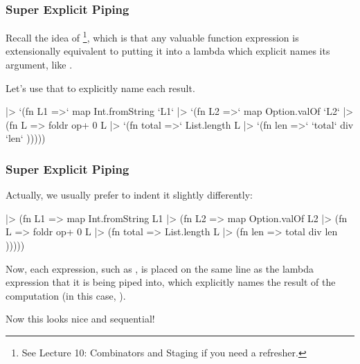 \documentclass[aspectratio=169, handout]{beamer}
\begin{document}
\begin{frame}[fragile]
  \frametitle{Super Explicit Piping}

  Recall the idea of \footnote{
    See Lecture 10: Combinators and Staging if you need a refresher.
  }, which is that any valuable
  function expression  is extensionally equivalent to putting it
  into a lambda which explicit names its argument, like .

  \pause
  \vspace{\fill}

  Let's use that to explicitly name each result.

  \pause
  \vspace{\fill}

  \begin{codeblock}
    ["1", "2", "3"]
    |> `(fn L1 =>`    map Int.fromString `L1`
    |> `(fn L2 =>`    map Option.valOf `L2`
    |> (fn L =>     foldr op+ 0 L
    |> `(fn total =>` List.length L
    |> `(fn len =>`   `total` div `len` )))))
  \end{codeblock}
\end{frame}


\begin{frame}[fragile]
  \frametitle{Super Explicit Piping}

  Actually, we usually prefer to indent it slightly differently:

  \begin{codeblock}
    ["1", "2", "3"]       |> (fn L1 =>
    map Int.fromString L1 |> (fn L2 =>
    map Option.valOf L2   |> (fn L =>
    foldr op+ 0 L         |> (fn total =>
    List.length L         |> (fn len =>
    total div len         )))))
  \end{codeblock}

  \pause
  \vspace{\fill}

  Now, each expression, such as , is placed
  on the same line as the lambda expression that it is being piped into,
  which explicitly names the result of the computation (in this case, ).

  \pause
  \vspace{\fill}

  Now this looks nice and sequential!
\end{frame}
\end{document}
